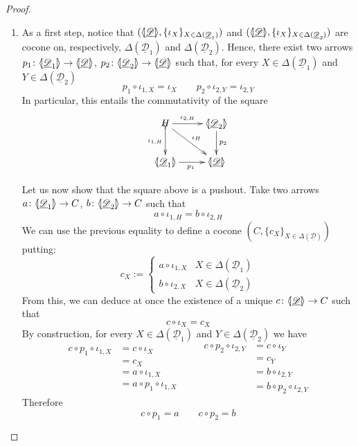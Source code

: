 \documentclass[a4paper]{article}
\newcommand{\dder}[1]{\mathscr{#1}}
\newcommand{\der}[1]{\underline{\dder{#1}}}
\newcommand{\lpro}{\langle \hspace{-1.85pt}[}
\newcommand{\rpro}{]\hspace{-1.85pt}\rangle}
\newcommand{\tpro}[1]{\lpro \der{#1}\rpro}
\newcommand{\tproi}[2]{\lpro \der{#1}_{#2}\rpro}
\theoremstyle{definition}
\begin{document}
\begin{proof}
\begin{enumerate}
		\item  As a first step, notice that $(\tpro{D}, \{\iota_X\}_{X\in \Delta(\der{D}_1)})$ and $(\tpro{D}, \{\iota_X\}_{X\in \Delta(\der{D}_2)})$ are cocone on, respectively, $\Delta(\der{D}_1)$ and $\Delta(\der{D}_2)$. Hence, there exist two arrows $p_1\colon \tproi{D}{1}\to \tpro{D}$, $p_2\colon \tproi{D}{2}\to \tpro{D}$ such that, for every $X\in  \Delta(\der{D}_1)$ and $Y\in  \Delta(\der{D}_2)$
		\[p_1\circ \iota_{1, X} = \iota_X \qquad p_2\circ \iota_{2, Y}=\iota_{2,Y}\]
		In particular, this entails the commutativity of the square
				\[\xymatrix{H \ar[dr]^{\iota_H} \ar[r]^-{\iota_{2, H}} \ar@{>->}[d]_-{\iota_{1, H}} & \tproi{D}{2} \ar[d]^{p_2}\\  \tproi{D}{1} \ar[r]_{p_1}& \tpro{D}}\]
		
	Let us now show that the square above is a pushout. Take two arrows $a\colon \tproi{D}{1}\to C$, $b\colon \tproi{D}{2}\to C$ such that
	\[a\circ \iota_{1, H}=b\circ \iota_{2, H}\]
	We can use the previous equality to define a cocone $(C, \{c_X\}_{X\in \Delta(\der{D})})$ putting:
	\[c_X:=\begin{cases}
		a\circ \iota_{1, X} & X\in \Delta(\der{D}_1)\\
		b\circ \iota_{2, X} & X\in \Delta(\der{D}_2)
	\end{cases}\]
From this, we can deduce at once the existence of a unique $c\colon \tpro{D}\to C$ such that 
\[c\circ \iota_X = c_X\]
By construction, for every $X\in  \Delta(\der{D}_1)$ and $Y\in  \Delta(\der{D}_2)$ we have
\[\begin{split}
	c\circ p_1 \circ \iota_{1,X}&=c\circ \iota_{X}\\&=c_X \\&=a\circ \iota_{1,X}\\&=a\circ p_1\circ \iota_{1,X}
\end{split}\qquad \begin{split}
	c\circ p_2 \circ \iota_{2,Y}&=c\circ \iota_{Y}\\&=c_Y \\&=b\circ \iota_{2,Y}\\&=b\circ p_2\circ \iota_{2,Y}
\end{split}\]
Therefore
\[c\circ p_1=a \qquad c\circ p_2 = b\]


\end{enumerate}
\end{proof}
\end{document}
